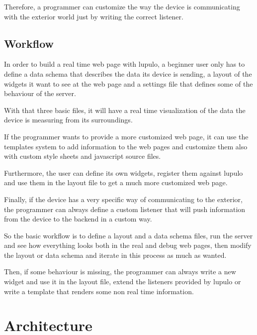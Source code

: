 \documentclass[12pt]{article}
\begin{document}
            Therefore, a programmer can customize the way the device is
            communicating with the exterior world just by writing the correct
            listener.

        \subsection{Workflow}
            In order to build a real time web page with lupulo, a beginner user
            only has to define a data schema that describes the data its device
            is sending, a layout of the widgets it want to see at the web page
            and a settings file that defines some of the behaviour of the
            server.

            With that three basic files, it will have a real time visualization
            of the data the device is measuring from its surroundings.

            If the programmer wants to provide a more customized web page, it
            can use the templates system to add information to the web pages and
            customize them also with custom style sheets and javascript source
            files.

            Furthermore, the user can define its own widgets, register them
            against lupulo and use them in the layout file to get a much more
            customized web page.

            Finally, if the device has a very specific way of communicating to
            the exterior, the programmer can always define a custom listener
            that will push information from the device to the backend in a
            custom way.

            So the basic workflow is to define a layout and a data schema files,
            run the server and see how everything looks both in the real and
            debug web pages, then modify the layout or data schema and iterate
            in this process as much as wanted.

            Then, if some behaviour is missing, the programmer can always write
            a new widget and use it in the layout file, extend the listeners
            provided by lupulo or write a template that renders some non real time
            information.

    \section{Architecture}
\end{document}
